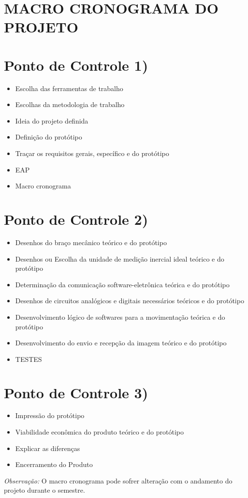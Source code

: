 \section{MACRO CRONOGRAMA DO PROJETO}

\section*{Ponto de Controle 1)}
\begin{itemize}
\item Escolha das ferramentas de trabalho
\item Escolhas da metodologia de trabalho
\item Ideia do projeto definida
\item Definição do protótipo
\item Traçar os requisitos gerais, específico e do protótipo
\item EAP 
\item Macro cronograma
\end{itemize}

\section*{Ponto de Controle 2)}
\begin{itemize}
\item Desenhos do braço mecânico teórico e do protótipo
\item Desenhos ou Escolha da unidade de medição inercial ideal teórico e do protótipo
\item Determinação da comunicação software-eletrônica teórica e do protótipo
\item Desenhos de circuitos analógicos e digitais necessários teóricos e do protótipo
\item Desenvolvimento lógico de softwares para a movimentação teórica e do protótipo
\item Desenvolvimento do envio e recepção da imagem teórico e do protótipo
\item TESTES
\end{itemize}

\section*{Ponto de Controle 3)}
\begin{itemize}
\item Impressão do protótipo
\item Viabilidade econômica do produto teórico e do protótipo
\item Explicar as diferenças
\item Encerramento do Produto
\end{itemize}

\noindent\textit{Observação:} O macro cronograma pode sofrer alteração com o andamento do projeto durante o semestre.